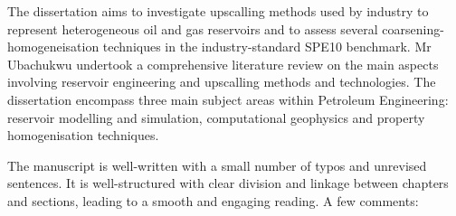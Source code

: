 \documentclass[14pt,twoside]{report}
\begin{document}
\medskip

The dissertation aims to investigate upscalling methods used by industry to represent heterogeneous oil and gas reservoirs and to assess several coarsening-homogeneisation techniques in the industry-standard SPE10 benchmark. Mr Ubachukwu undertook a comprehensive literature review on the main aspects involving reservoir engineering and upscalling methods and technologies. The dissertation encompass three main subject areas within Petroleum Engineering: reservoir modelling and simulation, computational geophysics and property homogenisation techniques.

The manuscript is well-written with a small number of typos and unrevised sentences. It is well-structured with clear division and linkage between chapters and sections, leading to a smooth and engaging reading. A few comments:
\end{document}

